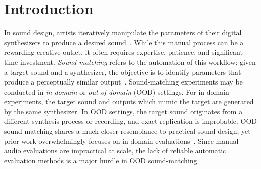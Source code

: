 \documentclass{article}
\begin{document}
\section{Introduction}



In sound design, artists iteratively manipulate the parameters of their digital synthesizers to produce a desired sound~\cite{krekovic2019insights}. While this manual process can be a rewarding creative outlet, it often requires expertise, patience, and significant time investment. \textit{Sound-matching} refers to the automation of this workflow: given a target sound and a synthesizer, the objective is to identify parameters that produce a perceptually similar output~\cite{justice1979analytic,horner1993machine,mitchell2007evolutionary}. Sound-matching experiments may be conducted in \textit{in-domain} or \textit{out-of-domain} (OOD) settings. For in-domain experiments, the target sound and outputs which mimic the target are generated by the same synthesizer. In OOD settings, the target sound originates from a different synthesis process or recording, and exact replication is improbable. OOD sound-matching shares a much closer resemblance to practical sound-design, yet prior work overwhelmingly focuses on in-domain evaluations~\cite{horner1993machine,yee2018automatic,han2023perceptual,vahidi2023mesostructures,salimi2025evaluating}. Since manual audio evaluations are impractical at scale, the lack of reliable automatic evaluation methods is a major hurdle in OOD sound-matching.
\end{document}
